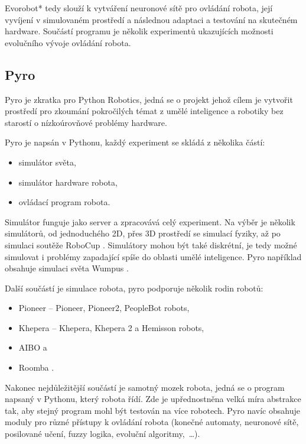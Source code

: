         Evorobot* tedy slouží k vytváření neuronové sítě pro ovládání robota,
        její vyvíjení v simulovaném prostředí a následnou adaptaci a testování
        na skutečném hardware. Součástí programu je několik experimentů
        ukazujících možnosti evolučního vývoje ovládání robota.

        \subsection{Pyro}
        \label{pyro}

        Pyro \cite{pyro} je zkratka pro Python Robotics, jedná se o projekt
        jehož cílem je vytvořit prostředí pro zkoumání pokročilých témat z
        umělé inteligence a robotiky bez starostí o nízkoúrovňové problémy
        hardware.

        Pyro je napsán v Pythonu, každý experiment se skládá z několika částí:
        \begin{itemize}
            \item simulátor světa,
            \item simulátor hardware robota,
            \item ovládací program robota.
        \end{itemize}

        Simulátor funguje jako server a zpracovává celý experiment. Na výběr je
        několik simulátorů, od jednoduchého 2D, přes 3D prostředí se simulací
        fyziky, až po simulaci soutěže RoboCup \cite{robocup}. Simulátory mohou
        být také diskrétní, je tedy možné simulovat i problémy zapadající spíše
        do oblasti umělé inteligence. Pyro například obsahuje simulaci světa
        Wumpus \cite{aima}.

        Další součástí je simulace robota, pyro podporuje několik
        rodin robotů:

        \begin{itemize}
            \item Pioneer \cite{pioneer} -- Pioneer, Pioneer2, PeopleBot robots,
            \item Khepera \cite{khepera} -- Khepera, Khepera 2 a Hemisson robots,
            \item AIBO \cite{aibo} a
            \item Roomba \cite{roomba}.
        \end{itemize}

        Nakonec nejdůležitější součástí je samotný mozek robota, jedná se o
        program napsaný v Pythonu, který robota řídí. Zde je upřednostněna
        velká míra abstrakce tak, aby stejný program mohl být testován na více
        robotech. Pyro navíc obsahuje moduly pro různé přístupy k ovládání
        robota (konečné automaty, neuronové sítě, posilované učení, fuzzy
        logika, evoluční algoritmy,~\ldots).

